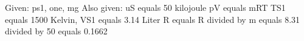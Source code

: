 Given: ps1, one, mg
Also given: uS equals 50 kilojoule
pV equals mRT
TS1 equals 1500 Kelvin, VS1 equals 3.14 Liter
R equals R divided by m equals 8.31 divided by 50 equals 0.1662